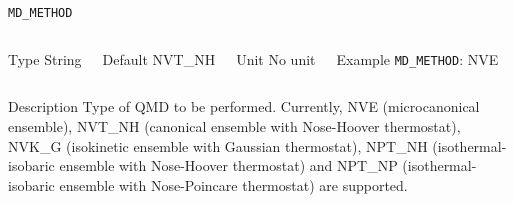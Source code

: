 \begin{frame}[allowframebreaks]{\texttt{MD\_METHOD}} \label{MD_METHOD}
\vspace*{-12pt}
\begin{columns}
\begin{block}{Type}
String
\end{block}

\begin{block}{Default}
NVT\_NH
\end{block}

\begin{block}{Unit}
No unit
\end{block}

\begin{block}{Example}
\texttt{MD\_METHOD}: NVE
\end{block}
\end{columns}

\begin{block}{Description}
Type of QMD to be performed. Currently, NVE (microcanonical ensemble), NVT\_NH (canonical ensemble with Nose-Hoover thermostat), NVK\_G (isokinetic ensemble with Gaussian thermostat), NPT\_NH (isothermal-isobaric ensemble with Nose-Hoover thermostat) and NPT\_NP (isothermal-isobaric ensemble with Nose-Poincare thermostat) are supported.
\end{block}

\end{frame}



